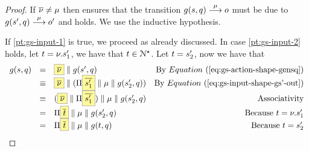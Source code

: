 \begin{proof}
  If $\overline{\nu} \neq \mu$ then 
  ensures that  the transition $g(s, q) \mathrel{\overset{ \mu }\longrightarrow} o $
  must be due to $g(s', q) \mathrel{\overset{ \mu }\longrightarrow} o'$ and  holds.
  We use the inductive hypothesis.

  If \ref{pt:gs-input-1} is true, we proceed as already discussed.
  In case \ref{pt:gs-input-2} holds, let $t =  \nu. s'_1$, we have that $t \in \mathcal{N}^{\star}$.
  Let $t = s'_2$, now we have that
  $$
  \begin{array}{lllr}
    \gen{s}{q} & = & \out{\nu} \Par \gen{s'}{q} &\text{By }\req{gs-action-shape-gensq} \\
    & \equiv & \out{\nu} \Par (\Pi \out{s'_1} \Par \mu \Par g(s'_2,q)) & \text{By }\req{gs-input-shape-gs'-out} \\
    & \equiv & (\out{\nu} \Par \Pi \out{s'_1}) \Par \mu \Par g(s'_2,q) &\text{Associativity}\\
    & = &  \Pi \out{ \traceA } \Par \mu \Par g(s'_2,q) & \text{Because }\traceA =  \nu. s'_1\\
    & = &  \Pi \out{ \traceA } \Par \mu \Par \gen{\traceB}{q} & \text{Because }\traceB =  s'_2\\
  \end{array}
$$
\end{proof}




